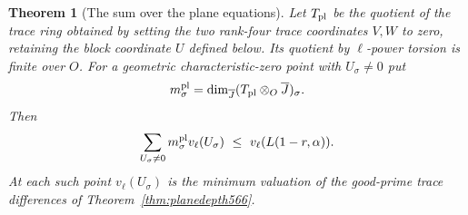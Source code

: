 \documentclass[a4paper,11pt]{article}
\newtheorem{theorem}[proposition]{Theorem}
\theoremstyle{definition}
\theoremstyle{remark}
\numberwithin{equation}{section}
\begin{document}
\begin{theorem}[The sum over the plane equations]
\leavevmode\label{thm:intrinsicplane567}
Let \(T_{\rm pl}\) be the quotient of the trace ring obtained
by setting the two rank-four trace coordinates \(V,W\) to
zero, retaining the block coordinate \(U\) defined below.
Its quotient by \(\ell\)-power torsion is finite over \(O\).
For a geometric characteristic-zero point with \(U_\sigma\ne0\)
put
\[
             m_\sigma^{\rm pl}
              =\dim_{\overline J}
                     (T_{\rm pl}\otimes_O\overline J)_\sigma .
\]
Then
\[
          \sum_{U_\sigma\ne0}
                m_\sigma^{\rm pl} v_\ell(U_\sigma)
                       \ \le\ v_\ell(L(1-r,\alpha)).
\]
At each such point \(v_\ell(U_\sigma)\) is the minimum
valuation of the good-prime trace differences of
Theorem~\ref{thm:planedepth566}.
\end{theorem}
\end{document}
